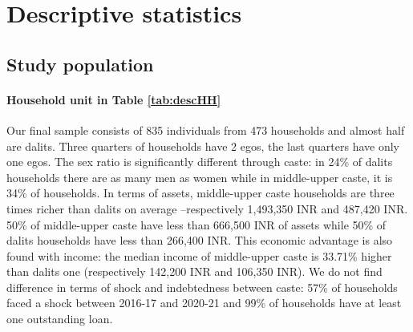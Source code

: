 \documentclass[a4paper, 11pt, onecolumn]{article}
\begin{document}




\newpage
\section{Descriptive statistics}


	\subsection{Study population}

\paragraph{Household unit in Table \ref{tab:descHH}}
Our final sample consists of 835 individuals from 473 households and almost half are dalits.
Three quarters of households have 2 egos, the last quarters have only one egos.
The sex ratio is significantly different through caste: in 24\% of dalits households there are as many men as women while in middle-upper caste, it is 34\% of households.
In terms of assets, middle-upper caste households are three times richer than dalits on average --respectively 1,493,350 INR and 487,420 INR.
50\% of middle-upper caste have less than 666,500 INR of assets while 50\% of dalits households have less than 266,400 INR.
This economic advantage is also found with income: the median income of middle-upper caste is 33.71\% higher than dalits one (respectively 142,200 INR and 106,350 INR).
We do not find difference in terms of shock and indebtedness between caste: 57\% of households faced a shock between 2016-17 and 2020-21 and 99\% of households have at least one outstanding loan.
		
\end{document}
